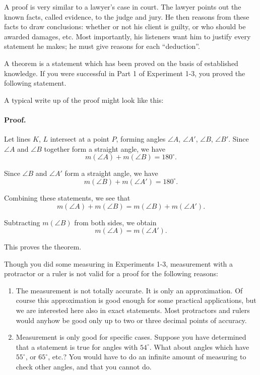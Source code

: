 \documentclass[12pt]{book} %
\begin{document}
A proof is very similar to a lawyer's case in court. The lawyer points out the known facts, called evidence, to the judge and jury. He then reasons from these facts to draw conclusions: whether or not his client is guilty, or who should be awarded damages, etc. Most importantly, his listeners want him to justify every statement he makes; he must give reasons for each ``deduction''.

A theorem is a statement which has been proved on the basis of established knowledge. If you were successful in Part 1 of Experiment 1-3, you proved the following statement.


A typical write up of the proof might look like this:


\paragraph{Proof.}
Let lines $K$, $L$ intersect at a point $P$, forming angles $\angle A$, $\angle A'$, $\angle B$, $\angle B'$. Since $\angle A$ and $\angle B$ together form a straight angle, we have
\[
m(\angle A)+m(\angle B)=180^\circ.
\]

Since $\angle B$ and $\angle A'$ form a straight angle, we have
\[
m(\angle B)+m(\angle A')=180^\circ.
\]

Combining these statements, we see that
\[
m(\angle A)+m(\angle B)=m(\angle B)+m(\angle A').
\]

Subtracting $m(\angle B)$ from both sides, we obtain
\[
m(\angle A)=m(\angle A').
\]

This proves the theorem.

Though you did some measuring in Experiments 1-3, measurement with a protractor or a ruler is not valid for a proof for the following reasons:
\begin{enumerate}
	\item The measurement is not totally accurate. It is only an approximation. Of course this approximation is good enough for some practical applications, but we are interested here also in exact statements. Most protractors and rulers would anyhow be good only up to two or three decimal points of accuracy.
	\item Measurement is only good for specific cases. Suppose you have determined that a statement is true for angles with $54^\circ$. What about angles which have $55^\circ$, or $65^\circ$, etc.? You would have to do an infinite amount of measuring to check other angles, and that you cannot do.
\end{enumerate}
\end{document}
